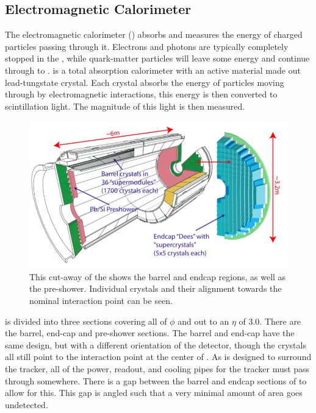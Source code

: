 \subsection{Electromagnetic Calorimeter}
The electromagnetic calorimeter (\ECAL) absorbs and measures the energy of charged particles passing through it.  Electrons and photons are typically completely stopped in the \ECAL, while quark-matter particles will leave some energy and continue through to \HCAL.  \ECAL is a total absorption calorimeter with an active material made out lead-tungstate crystal.  Each crystal absorbs the energy of particles moving through by electromagnetic interactions, this energy is then converted to scintillation light.  The magnitude of this light is then measured.

\begin{figure}[!htbp]
    \centering
    \includegraphics[width=\textwidth]{figures/ECAL_diag.png}
    \caption[
       \CMS \ECAL diagram.
    ]{
        This cut-away of the \ECAL shows the barrel and endcap regions, as well as the pre-shower.  Individual crystals and their alignment towards the nominal interaction point can be seen. \cite{ecalPerf}
    }
    \label{fig:ecal}
\end{figure}

\ECAL is divided into three sections covering all of \ensuremath{\phi} and out to an \ensuremath{\eta} of 3.0.  There are the barrel, end-cap and pre-shower sections.  The barrel and end-cap have the same design, but with a different orientation of the detector, though the crystals all still point to the interaction point at the center of \CMS.  As \ECAL is designed to surround the tracker, all of the power, readout, and cooling pipes for the tracker must pass through \ECAL somewhere.  There is a gap between the barrel and endcap sections of \ECAL to allow for this.  This gap is angled such that a very minimal amount of area goes undetected.


